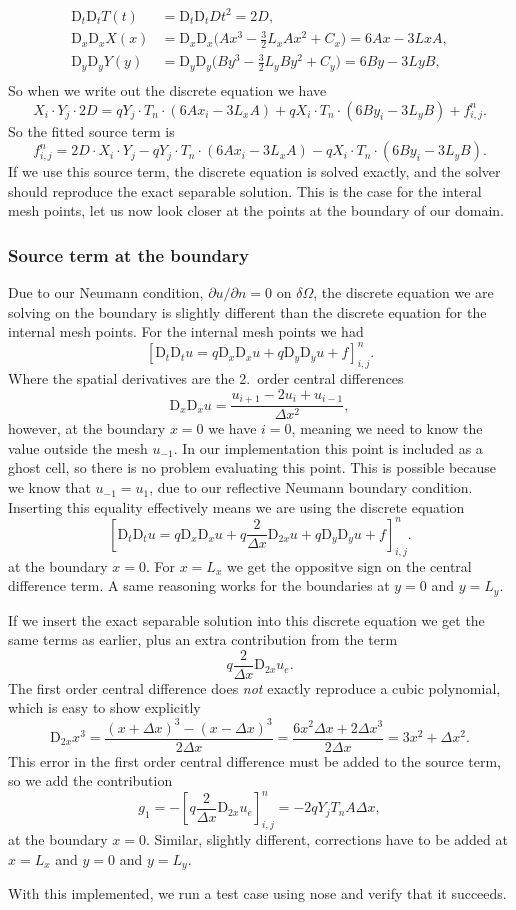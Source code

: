 \documentclass[a4paper, 11pt, notitlepage, english]{article}
\newcommand{\p}{\partial}
\newcommand{\D}{\mbox{D}}
\begin{document}
\begin{align*}
\D_t \D_t T(t) &= \D_t \D_t Dt^2 = 2D, \\
\D_x \D_x X(x) &= \D_x \D_x \bigg(A x^3 -\frac{3}{2}L_xAx^2 + C_x\bigg) = 6Ax - 3LxA, \\  
\D_y \D_y Y(y) &= \D_y \D_y \bigg(B y^3 -\frac{3}{2}L_yBy^2 + C_y\bigg) = 6By - 3LyB, \\  
\end{align*}
So when we write out the discrete equation we have
$$X_i \cdot Y_j \cdot 2D = q Y_j \cdot T_n \cdot(6Ax_i - 3L_x A) + qX_i\cdot T_n \cdot(6By_i - 3L_y B) + f_{i,j}^n.$$
So the fitted source term is
$$f_{i,j}^n = 2D\cdot X_i\cdot Y_j - q Y_j \cdot T_n \cdot(6Ax_i - 3L_xA) - qX_i\cdot T_n \cdot(6By_i - 3L_yB).$$
If we use this source term, the discrete equation is solved exactly, and the solver should reproduce the exact separable solution. This is the case for the interal mesh
points, let us now look closer at the points at the boundary of our domain.

\subsubsection*{Source term at the boundary}

Due to our Neumann condition, $\p u/\p n = 0$ on $\delta \Omega$, the discrete equation we are solving on the boundary is slightly different than the discrete equation 
for the internal mesh points. For the internal mesh points we had
$$[\D_t\D_t u = q \D_x \D_x u + q \D_y \D_y u + f]^{n}_{i,j}.$$
Where the spatial derivatives are the 2.\ order central differences
$$\D_x \D_x u = \frac{u_{i+1} - 2u_i + u_{i-1}}{\Delta x^2},$$
however, at the boundary $x = 0$ we have $i=0$, meaning we need to know the value outside the mesh $u_{-1}$. In our implementation this point is included as a 
ghost cell, so there is no problem evaluating this point. This is possible because we know that $u_{-1} = u_{1}$, due to our reflective Neumann boundary condition. 
Inserting this equality effectively means we are using the discrete equation
$$[\D_t\D_t u = q \D_x \D_x u + q\frac{2}{\Delta x} \D_{2x}u +  q \D_y \D_y u + f]^{n}_{i,j}.$$
at the boundary $x = 0$. For $x=L_x$ we get the oppositve sign on the central difference term. A same reasoning works for the boundaries at $y=0$ and $y=L_y$.

If we insert the exact separable solution into this discrete equation we get the same terms as earlier, plus an extra contribution from the term
$$q\frac{2}{\Delta x} \D_{2x} u_e.$$
The first order central difference does \emph{not} exactly reproduce a cubic polynomial, which is easy to show explicitly
$$\D_{2x} x^3 = \frac{(x+\Delta x)^3 - (x-\Delta x)^3}{2\Delta x} = \frac{6x^2\Delta x + 2\Delta x^3}{2\Delta x} = 3x^2 + \Delta x^2.$$
This error in the first order central difference must be added to the source term, so we add the contribution
$$g_1 = -[q\frac{2}{\Delta x} \D_{2x} u_e]_{i,j}^n = -2qY_jT_n A \Delta x,$$
at the boundary $x = 0$. Similar, slightly different, corrections have to be added at $x=L_x$ and $y=0$ and $y=L_y$.

With this implemented, we run a test case using nose and verify that it succeeds.
\end{document}
